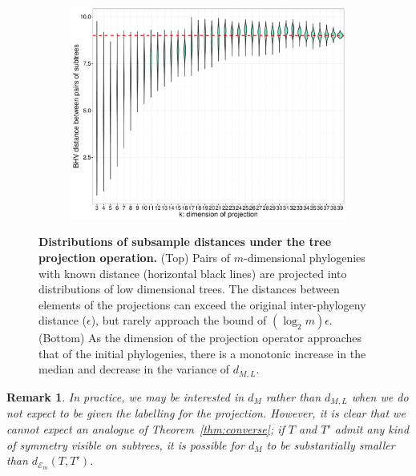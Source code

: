 \documentclass[a4paper,11pt]{article}
\newtheorem{remark}[theorem]{Remark}
\newcommand{\aE}{\mathcal{E}}
\begin{document}
\begin{figure}
    \begin{subfigure}{\linewidth}
    \centering
    \includegraphics[width=0.8\linewidth]{../figures/dimred_pwdist_m40_vs_K.pdf}
    \end{subfigure}

    \caption{{\bf Distributions of subsample distances under the tree projection operation.} (Top) Pairs of $m$-dimensional phylogenies with known distance (horizontal black lines) are projected into distributions of low dimensional trees. The distances between elements of the projections can exceed the original inter-phylogeny distance ($\epsilon$), but rarely approach the bound of $(\log_2 m)\epsilon$. (Bottom) As the dimension of the projection operator approaches that of the initial phylogenies, there is a monotonic increase in the median and decrease in the variance of $d_{M,L}$.}
    \label{fig:dimred_calibration}
\end{figure}

\begin{remark}
In practice, we may be interested in $d_M$ rather than $d_{M,L}$ when we do not expect to be given the labelling for the projection.
However, it is clear that we cannot expect an analogue of Theorem~\ref{thm:converse}; if $T$ and $T'$ admit any kind of symmetry visible on subtrees, it is possible for $d_M$ to be substantially smaller than $d_{\aE_m}(T,T')$.
\end{remark}
\end{document}
